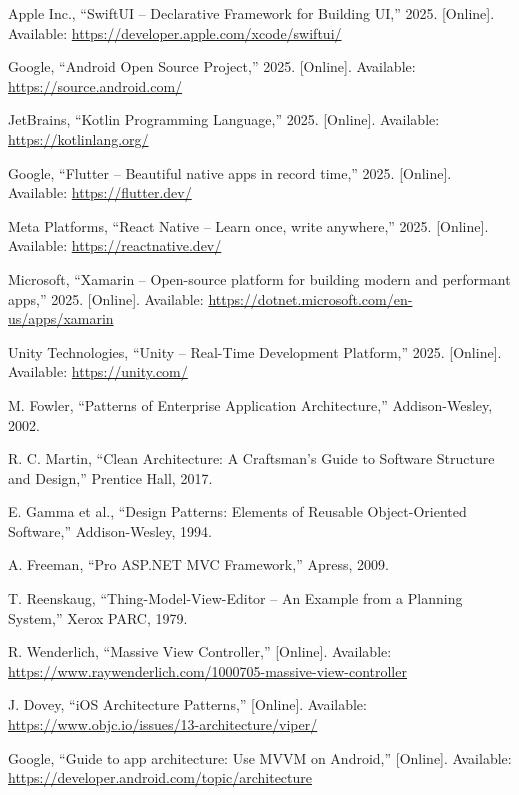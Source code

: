\documentclass[12pt]{report}
\begin{document}
\begin{thebibliography}{1}
  Apple Inc., ``SwiftUI – Declarative Framework for Building UI,'' 2025. [Online]. Available: \url{https://developer.apple.com/xcode/swiftui/}

  Google, ``Android Open Source Project,'' 2025. [Online]. Available: \url{https://source.android.com/}

  JetBrains, ``Kotlin Programming Language,'' 2025. [Online]. Available: \url{https://kotlinlang.org/}

  Google, ``Flutter – Beautiful native apps in record time,'' 2025. [Online]. Available: \url{https://flutter.dev/}

  Meta Platforms, ``React Native – Learn once, write anywhere,'' 2025. [Online]. Available: \url{https://reactnative.dev/}

  Microsoft, ``Xamarin – Open-source platform for building modern and performant apps,'' 2025. [Online]. Available: \url{https://dotnet.microsoft.com/en-us/apps/xamarin}

  Unity Technologies, ``Unity – Real-Time Development Platform,'' 2025. [Online]. Available: \url{https://unity.com/}

  M. Fowler, ``Patterns of Enterprise Application Architecture,'' Addison-Wesley, 2002.

  R. C. Martin, ``Clean Architecture: A Craftsman's Guide to Software Structure and Design,'' Prentice Hall, 2017.

  E. Gamma et al., ``Design Patterns: Elements of Reusable Object-Oriented Software,'' Addison-Wesley, 1994.

  A. Freeman, ``Pro ASP.NET MVC Framework,'' Apress, 2009.

  T. Reenskaug, ``Thing-Model-View-Editor – An Example from a Planning System,'' Xerox PARC, 1979.

  R. Wenderlich, ``Massive View Controller,'' [Online]. Available: \url{https://www.raywenderlich.com/1000705-massive-view-controller}

  J. Dovey, ``iOS Architecture Patterns,'' [Online]. Available: \url{https://www.objc.io/issues/13-architecture/viper/}

  Google, ``Guide to app architecture: Use MVVM on Android,'' [Online]. Available: \url{https://developer.android.com/topic/architecture}


\end{thebibliography}
\end{document}
